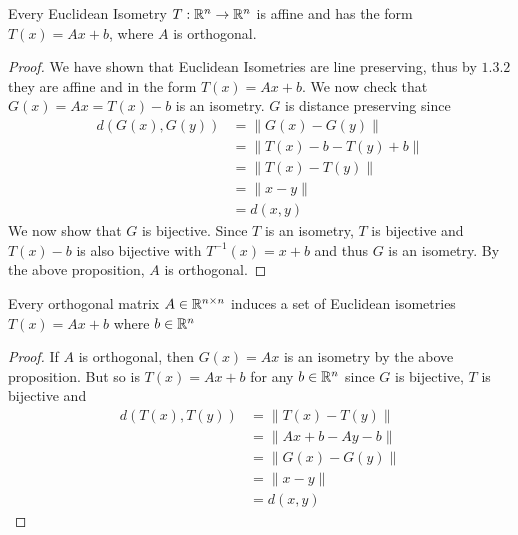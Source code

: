\documentclass[a4paper]{article}
\begin{document}
\begin{thm}{}{} Every Euclidean Isometry $T:\mathbb{R}^n\to\mathbb{R}^n$ is affine and has the form $T(x)=Ax+b$, where $A$ is orthogonal. \tcbline
\begin{proof} We have shown that Euclidean Isometries are line preserving, thus by $1.3.2$ they are affine and in the form $T(x)=Ax+b$. We now check that $G(x)=Ax=T(x)-b$ is an isometry. $G$ is distance preserving since
\begin{align*}
d(G(x),G(y))&=\|G(x)-G(y)\|\\
&=\|T(x)-b-T(y)+b\|\\
&=\|T(x)-T(y)\|\\
&=\|x-y\|\tag{$T$ is an isometry}\\
&=d(x,y)
\end{align*}
We now show that $G$ is bijective. Since $T$ is an isometry, $T$ is bijective and $T(x)-b$ is also bijective with $T^{-1}(x)=x+b$ and thus $G$ is an isometry. By the above proposition, $A$ is orthogonal. 
\end{proof}
\end{thm}

\begin{prp}{}{} Every orthogonal matrix $A\in\mathbb{R}^{n\times n}$ induces a set of Euclidean isometries $T(x)=Ax+b$ where $b\in\mathbb{R}^n$ \tcbline
\begin{proof} If $A$ is orthogonal, then $G(x)=Ax$ is an isometry by the above proposition. But so is $T(x)=Ax+b$ for any $b\in\mathbb{R}^n$ since $G$ is bijective, $T$ is bijective and 
\begin{align*}
d(T(x),T(y))&=\|T(x)-T(y)\|\\
&=\|Ax+b-Ay-b\|\\
&=\|G(x)-G(y)\|\\
&=\|x-y\|\tag{$G$ is an isometry}\\
&=d(x,y)
\end{align*}
\end{proof}
\end{prp}
\end{document}
